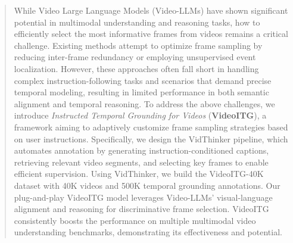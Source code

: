 \begin{abstract}

While Video Large Language Models (Video-LLMs) have shown significant potential in multimodal understanding and reasoning tasks, how to efficiently select the most informative frames from videos remains a critical challenge. Existing methods attempt to optimize frame sampling by reducing inter-frame redundancy or employing unsupervised event localization. However, these approaches often fall short in handling complex instruction-following tasks and scenarios that demand precise temporal modeling, resulting in limited performance in both semantic alignment and temporal reasoning. To address the above challenges, we introduce \textit{Instructed Temporal Grounding for Videos} (\textbf{VideoITG}), a framework aiming to adaptively customize frame sampling strategies based on user instructions. Specifically, we design the VidThinker pipeline, which automates annotation by generating instruction-conditioned captions, retrieving relevant video segments, and selecting key frames to enable efficient supervision. Using VidThinker, we build the VideoITG-40K dataset with 40K videos and 500K temporal grounding annotations. Our plug-and-play VideoITG model leverages Video-LLMs’ visual-language alignment and reasoning for discriminative frame selection. VideoITG consistently boosts the performance on multiple multimodal video understanding benchmarks, demonstrating its effectiveness and potential.



\end{abstract}
